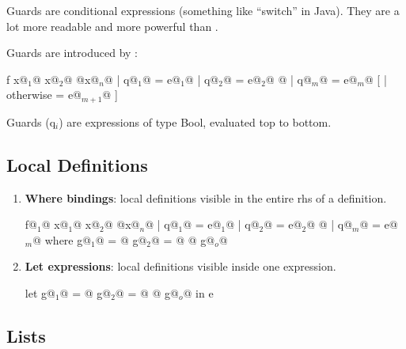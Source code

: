 Guards are conditional expressions (something like ``switch'' in Java).
They are a lot more readable and more powerful than .

Guards are introduced by \codeline{|}:
\begin{codebox}[haskell]
f x@$_1$@ x@$_2$@ @\dots@ x@$_n$@
  | q@$_1$@     = e@$_1$@
  | q@$_2$@     = e@$_2$@
  @\dots@
  | q@$_m$@     = e@$_m$@
[ | otherwise   = e@$_{m+1}$@ ]
\end{codebox}

Guards (q$_i$) are expressions of type Bool, evaluated top to bottom.




\subsection{Local Definitions}

\begin{enumerate}
  \item \textbf{Where bindings}: local definitions visible in the entire rhs of a definition.\\
  \begin{codebox}[haskell]
f@$_1$@ x@$_1$@ x@$_2$@ @\dots@ x@$_n$@ | q@$_1$@ = e@$_1$@
                    | q@$_2$@ = e@$_2$@ 
                    @\dots@
                    | q@$_m$@ = e@$_m$@ 
          where 
              g@$_1$@ = @\dots@
              g@$_2$@ = @\dots@
              @\dots@
              g@$_o$@
  \end{codebox}


  \item \textbf{Let expressions}: local definitions visible inside one expression.\\
  \begin{codebox}[haskell]
let g@$_1$@ = @\dots@
    g@$_2$@ = @\dots@
    @\dots@
    g@$_o$@
in e
  \end{codebox}
\end{enumerate}


\subsection{Lists}

